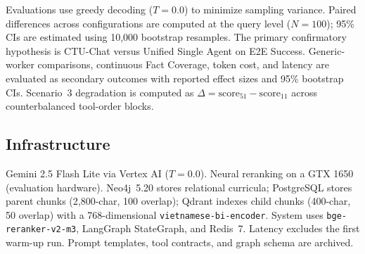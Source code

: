 Evaluations use greedy decoding ($T{=}0.0$) to minimize sampling variance. Paired differences across configurations are computed at the query level ($N{=}100$); 95\% CIs are estimated using 10,000 bootstrap resamples. The primary confirmatory hypothesis is CTU-Chat versus Unified Single Agent on E2E Success. Generic-worker comparisons, continuous Fact Coverage, token cost, and latency are evaluated as secondary outcomes with reported effect sizes and 95\% bootstrap CIs. Scenario~3 degradation is computed as $\Delta = \text{score}_{51} - \text{score}_{11}$ across counterbalanced tool-order blocks.

\subsection{Infrastructure}
\label{sec:infrastructure}

Gemini 2.5 Flash Lite via Vertex AI ($T{=}0.0$). Neural reranking on a GTX 1650 (evaluation hardware). Neo4j~5.20 stores relational curricula; PostgreSQL stores parent chunks (2,800-char, 100 overlap); Qdrant indexes child chunks (400-char, 50 overlap) with a 768-dimensional \texttt{vietnamese-bi-encoder}. System uses \texttt{bge-reranker-v2-m3}, LangGraph StateGraph, and Redis~7. Latency excludes the first warm-up run. Prompt templates, tool contracts, and graph schema are archived.
